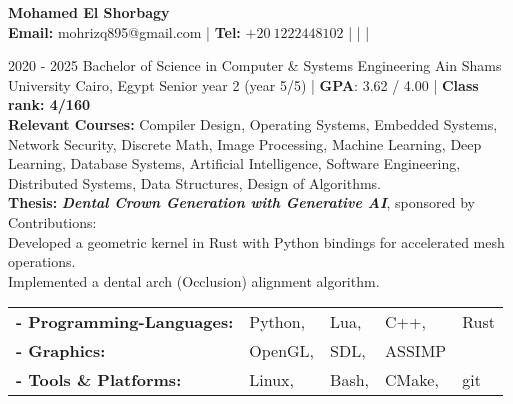 \documentclass[]{report}
\begin{document}
\begin{center}
    \noindent \Huge{\bfseries Mohamed El Shorbagy}\\[.4em]
    \large
        \textbf{Email:} mohrizq895@gmail.com 
    |   \textbf{Tel:} $+20 \ 1222448102$
    |   
    |   
    |      
\end{center}

\vspace{2mm}

\large
{}

\entry
    {2020 - 2025} 
    {Bachelor of Science in Computer \& Systems Engineering }
    {Ain Shams University}
    {Cairo, Egypt}
    {\tb Senior year 2 (year 5/5) | \textbf{GPA}: 3.62 / 4.00 | \textbf{Class rank: 4/160} \\  
     \tb \textbf{Relevant Courses:} Compiler Design, Operating Systems, Embedded Systems, Network Security, Discrete Math, Image Processing, Machine Learning, Deep Learning, Database Systems, Artificial Intelligence, Software Engineering, Distributed Systems, Data Structures, Design of Algorithms.\\
     \tb \textbf{Thesis:} \emph{\textbf{Dental Crown Generation with Generative AI}}, sponsored by \\
     Contributions:\\
     \hspace*{5mm} \tb Developed a geometric kernel in Rust with Python bindings for accelerated mesh operations.\\
     \hspace*{5mm} \tb Implemented a dental arch (Occlusion) alignment algorithm.
    }  

\vspace{2mm}


\begin{tabular}{ l l l l l}
      \bf{- Programming-Languages:} & Python, & Lua, & C++, & Rust\\ 
      \bf{- Graphics:} & OpenGL,&  SDL, & ASSIMP \\ 
      \bf{- Tools \& Platforms:} & Linux, & Bash, & CMake, & git \\ 
       
\end{tabular}
\end{document}
